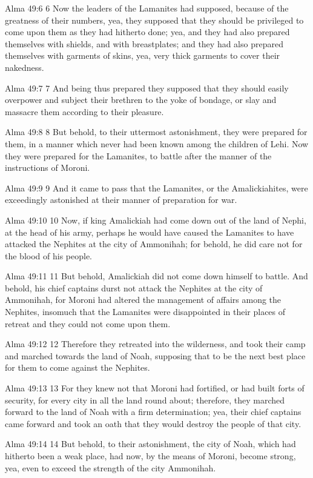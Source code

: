 Alma 49:6
 6 Now the leaders of the Lamanites had supposed, because of the
greatness of their numbers, yea, they supposed that they should
be privileged to come upon them as they had hitherto done; yea,
and they had also prepared themselves with shields, and with
breastplates; and they had also prepared themselves with garments
of skins, yea, very thick garments to cover their nakedness.

Alma 49:7
 7 And being thus prepared they supposed that they should easily
overpower and subject their brethren to the yoke of bondage, or
slay and massacre them according to their pleasure.

Alma 49:8
 8 But behold, to their uttermost astonishment, they were
prepared for them, in a manner which never had been known among
the children of Lehi. Now they were prepared for the Lamanites,
to battle after the manner of the instructions of Moroni.

Alma 49:9
 9 And it came to pass that the Lamanites, or the Amalickiahites,
were exceedingly astonished at their manner of preparation for
war.

Alma 49:10
 10 Now, if king Amalickiah had come down out of the land of
Nephi, at the head of his army, perhaps he would have caused the
Lamanites to have attacked the Nephites at the city of Ammonihah;
for behold, he did care not for the blood of his people.

Alma 49:11
 11 But behold, Amalickiah did not come down himself to battle.
And behold, his chief captains durst not attack the Nephites at
the city of Ammonihah, for Moroni had altered the management of
affairs among the Nephites, insomuch that the Lamanites were
disappointed in their places of retreat and they could not come
upon them.

Alma 49:12
 12 Therefore they retreated into the wilderness, and took their
camp and marched towards the land of Noah, supposing that to be
the next best place for them to come against the Nephites.

Alma 49:13
 13 For they knew not that Moroni had fortified, or had built
forts of security, for every city in all the land round about;
therefore, they marched forward to the land of Noah with a firm
determination; yea, their chief captains came forward and took an
oath that they would destroy the people of that city.

Alma 49:14
 14 But behold, to their astonishment, the city of Noah, which
had hitherto been a weak place, had now, by the means of Moroni,
become strong, yea, even to exceed the strength of the city
Ammonihah.

